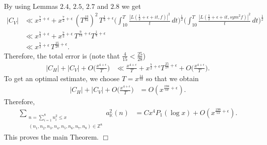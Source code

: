 \documentclass[preprint,12pt]{elsarticle}
\numberwithin{equation}{section}
\begin{document}
By using Lemmas $2.4$, $2.5$, $2.7$ and $2.8$ we get
\begin{align*}
	|C_{V}| &\ll x^{\frac{7}{2}+\epsilon}+ x^{\frac{7}{2}+\epsilon}\,(T^{\frac{13}{84}})^{2}\,T^{\frac{1}{3}+\epsilon}\Big(\int_{10}^{T}\frac{|L(\frac{1}{2}+\epsilon+it,f)|^{2}}{t}\,dt\Big)^{\frac{1}{2}}\Big(\int_{10}^{T}\frac{|L(\frac{1}{2}+\epsilon+it,sym^{2}f)|^{2}}{t}\,dt\Big)^{\frac{1}{2}}\\
	& \ll x^{\frac{7}{2}+\epsilon}+ x^{\frac{7}{2}+\epsilon}\,T^{\frac{9}{14}+\epsilon} T^{\frac{1}{4}+\epsilon} \\
	&\ll x^{\frac{7}{2}+\epsilon}\,T^{\frac{25}{28}+\epsilon}.
\end{align*}
Therefore, the total error is (note that $\frac{4}{15}<\frac{25}{28}$)
\begin{align*}
	|C_{H}|+|C_{V}|+O\Big(\frac{x^{4+\epsilon}}{T}\Big)&\ll\frac{x^{4+\epsilon}}{T}+x^{\frac{7}{2}+\epsilon}T^{\frac{25}{28}+\epsilon}+O\Big(\frac{x^{4+\epsilon}}{T}\Big).
\end{align*}
To get an optimal estimate, we choose $T=x^{\frac{14}{53}}$ so that we obtain
\begin{align*}
	|C_{H}|+|C_{V}|+O\Big(\frac{x^{4+\epsilon}}{T}\Big)&= O(x^{\frac{198}{53}+\epsilon}).
\end{align*}
Therefore, 
\begin{align*}
	\sum\limits_{\substack{n=\sum_{i=1}^{8}n_{i}^{2} \leq x\\(n_1,n_2,n_{3},n_{4},n_{5},n_{6},n_{7},n_{8})\in \mathbb{Z}^{8}}} a_{\mathbb{K}}^{2}(n)&= Cx^{4}P_{1}(\log{x})+O(x^{\frac{198}{53}+\epsilon}).
\end{align*}
This proves the main Theorem.
\hfill $\Box$
\end{document}
